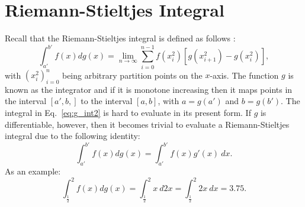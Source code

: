 \documentclass{article}
\theoremstyle{theorem}
\theoremstyle{definition}
\begin{document}

\section{Riemann-Stieltjes Integral}
Recall that the Riemann-Stieltjes integral is defined as follows \cite{bartle76}:
\begin{equation}
\label{eq:g_int2}
\int_{a'}^{b'} f(x) dg(x) =  \lim_{n \rightarrow \infty}\sum_{i=0}^{n-1} f(x_i^2)[g(x_{i+1}^2)-g(x_{i}^2)], 
\end{equation}
\noindent
with $(x_i^2)_{i=0}^n$ being arbitrary partition points on the $x$-axis. 
The function $g$ is known as the integrator and if it is monotone increasing then it maps points in the interval $[a',b,]$ to the interval $[a,b]$, with $a = g(a')$ and $b = g(b')$.
The integral in Eq.~\eqref{eq:g_int2} is hard to evaluate in its present form. If $g$ is differentiable, however, then it becomes trivial to 
evaluate a Riemann-Stieltjes integral due to the following identity:
\begin{equation}
\int_{a'}^{b'} f(x) dg(x) = \int_{a'}^{b'} f(x)g'(x)~dx.
\end{equation}
As an example:
\begin{equation}
\int_{\frac{1}{2}}^{2} f(x) dg(x)=\int_{\frac{1}{2}}^2 x~d2x = \int_{\frac{1}{2}}^2 2x~dx = 3.75. 
\end{equation}
\end{document}
